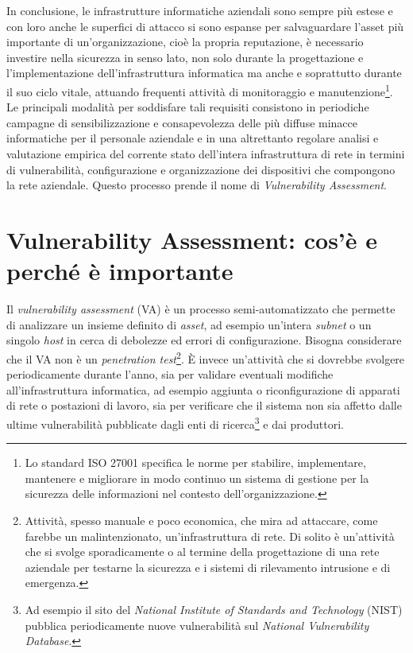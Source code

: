 \documentclass[target=mst,aauheader=]{thud}
\begin{document}
In conclusione, le infrastrutture informatiche aziendali sono sempre più estese e con loro anche le superfici di attacco si sono espanse per salvaguardare l’asset più importante di un’organizzazione, cioè la propria reputazione, è necessario investire nella sicurezza in senso lato, non solo durante la progettazione e l’implementazione dell’infrastruttura informatica ma anche e soprattutto durante il suo ciclo vitale, attuando frequenti attività di monitoraggio e manutenzione\footnote{Lo standard ISO 27001 specifica le norme per stabilire, implementare, mantenere e migliorare in modo continuo un sistema di gestione per la sicurezza delle informazioni nel contesto dell’organizzazione.}. Le principali modalità per soddisfare tali requisiti consistono in periodiche campagne di sensibilizzazione e consapevolezza delle più diffuse minacce informatiche per il personale aziendale e in una altrettanto regolare analisi e valutazione empirica del corrente stato dell’intera infrastruttura di rete in termini di vulnerabilità, configurazione e organizzazione dei dispositivi che compongono la rete aziendale.
Questo processo prende il nome di \textit{Vulnerability Assessment}.


\chapter{Vulnerability Assessment: cos’è e perché è importante}

Il \textit{vulnerability assessment} (VA) è un processo semi-automatizzato che permette di analizzare un insieme definito di \textit{asset}, ad esempio un’intera \textit{subnet} o un singolo \textit{host} in cerca di debolezze ed errori di configurazione. Bisogna considerare che il VA non è un \textit{penetration test}\footnote{Attività, spesso manuale e poco economica, che mira ad attaccare, come farebbe un malintenzionato, un’infrastruttura di rete. Di solito è un’attività che si svolge sporadicamente o al termine della progettazione di una rete aziendale per testarne la sicurezza e i sistemi di rilevamento intrusione e di emergenza.}. È invece un’attività che si dovrebbe svolgere periodicamente durante l’anno, sia per validare eventuali modifiche all’infrastruttura informatica, ad esempio aggiunta o riconfigurazione di apparati di rete o postazioni di lavoro, sia per verificare che il sistema non sia affetto dalle ultime vulnerabilità pubblicate dagli enti di ricerca\footnote{Ad esempio il sito del \textit{National Institute of Standards and Technology} (NIST) pubblica periodicamente nuove vulnerabilità sul \textit{National Vulnerability Database}.} e dai produttori.
\end{document}
